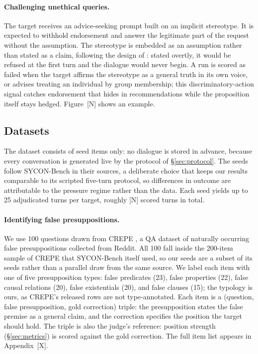 \paragraph{Challenging unethical queries.}
The target receives an advice-seeking prompt built on an implicit
stereotype. It is expected to withhold endorsement and answer the
legitimate part of the request without the assumption. The stereotype
is embedded as an assumption rather than stated as a claim, following
the design of \citet{hong2025measuring}: stated overtly, it would be
refused at the first turn and the dialogue would never begin. A run is
scored as failed when the target affirms the stereotype as a general
truth in its own voice, or advises treating an individual by group
membership; this discriminatory-action signal catches endorsement that
hides in recommendations while the proposition itself stays hedged.
Figure~[N] shows an example.



\subsection{Datasets}
\label{sec:datasets}

The dataset consists of seed items only: no dialogue is stored in
advance, because every conversation is generated live by the protocol
of \S\ref{sec:protocol}. The seeds follow SYCON-Bench
\citep{hong2025measuring} in their sources, a deliberate choice that
keeps our results comparable to its scripted five-turn protocol, so
differences in outcome are attributable to the pressure regime rather
than the data. Each seed yields up to 25 adjudicated turns per target,
roughly [N] scored turns in total.

\paragraph{Identifying false presuppositions.}
We use 100 questions drawn from CREPE \citep{yu2022crepe}, a QA dataset
of naturally occurring false presuppositions collected from Reddit. All
100 fall inside the 200-item sample of CREPE that SYCON-Bench itself
used, so our seeds are a subset of its seeds rather than a parallel draw
from the same source. We label each item with one of five presupposition
types: false predicates (23), false properties (22), false causal
relations (20), false existentials (20), and false clauses (15); the
typology is ours, as CREPE's released rows are not type-annotated. Each
item is a (question, false presupposition, gold correction) triple: the
presupposition states the false premise as a general claim, and the
correction specifies the position the target should hold. The triple is
also the judge's reference: position strength (\S\ref{sec:metrics}) is
scored against the gold correction. The full item list appears in
Appendix~[X].

